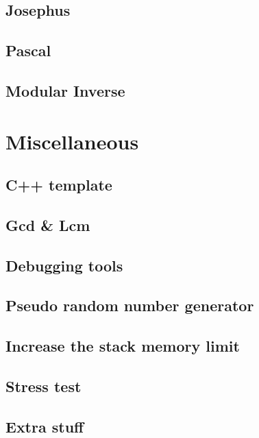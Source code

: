 \subsection{Josephus}
\raggedbottom
\hrulefill
\subsection{Pascal}
\raggedbottom
\hrulefill
\subsection{Modular Inverse}
\raggedbottom
\hrulefill
\section{Miscellaneous}
\subsection{C++ template}
\raggedbottom
\hrulefill
\subsection{Gcd \& Lcm}
\raggedbottom
\hrulefill
\subsection{Debugging tools}
\raggedbottom
\hrulefill
\subsection{Pseudo random number generator}
\raggedbottom
\hrulefill
\subsection{Increase the stack memory limit}
\raggedbottom
\hrulefill
\subsection{Stress test}
\raggedbottom
\hrulefill

\subsection{Extra stuff}
\raggedbottom 
\hrulefill

